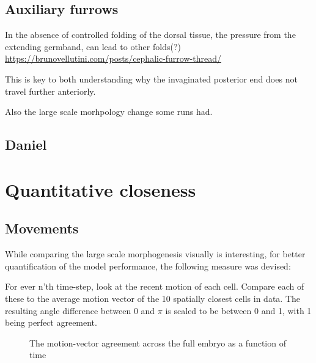 \subsection{Auxiliary furrows}

In the absence of controlled folding of the dorsal tissue, the pressure from the extending germband, can lead to other folds(?) \url{https://brunovellutini.com/posts/cephalic-furrow-thread/}

This is key to both understanding why the invaginated posterior end does not travel further anteriorly.

Also the large scale morhpology change some runs had.
\subsection{Daniel}
\section{Quantitative closeness}
\subsection{Movements}
While comparing the large scale morphogenesis visually is interesting, for better quantification of the model performance, the following measure was devised:

For ever n'th time-step, look at the recent motion of each cell. Compare each of these to the average motion vector of the 10 spatially closest cells in data. The resulting angle difference between 0 and $\pi$ is scaled to be between 0 and 1, with 1 being perfect agreement.

\begin{figure}[H]
    \centering
    \caption{The motion-vector agreement across the full embryo as a function of time}
    \label{fig:motionAgreement}
\end{figure}

